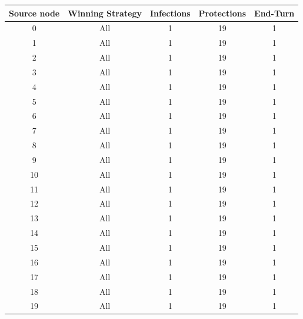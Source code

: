\documentclass[results.tex]{subfiles}
\begin{document}
\begin{center}
 \begin{tabular}{| c || c | c | c | c |} 
 \hline
 {\bfseries Source node} & {\bfseries Winning Strategy} & {\bfseries Infections} & {\bfseries Protections} & {\bfseries End-Turn} \\  %
 \hline\hline
 0 & All & 1 & 19 & 1 \\ 
 \hline
  1 & All & 1 & 19 & 1 \\ 
 \hline
  2 & All & 1 & 19 & 1 \\ 
 \hline
  3 & All & 1 & 19 & 1 \\ 
 \hline
  4 & All & 1 & 19 & 1 \\  
 \hline
  5 & All & 1 & 19 & 1 \\ 
 \hline
  6 & All & 1 & 19 & 1 \\  
 \hline
  7 & All & 1 & 19 & 1 \\ 
 \hline
  8 & All & 1 & 19 & 1 \\ 
 \hline
  9 & All & 1 & 19 & 1 \\ 
 \hline
 10 & All & 1 & 19 & 1 \\ 
 \hline
 11 & All & 1 & 19 & 1 \\ 
 \hline
 12 & All & 1 & 19 & 1 \\ 
 \hline
 13 & All & 1 & 19 & 1 \\ 
 \hline
 14 & All & 1 & 19 & 1 \\ 
 \hline
 15 & All & 1 & 19 & 1 \\ 
 \hline
 16 & All & 1 & 19 & 1 \\ 
 \hline
 17 & All & 1 & 19 & 1 \\ 
 \hline
 18 & All & 1 & 19 & 1 \\ 
 \hline
 19 & All & 1 & 19 & 1 \\
 \hline
 \end{tabular}
\end{center}

\newpage
\end{document}
